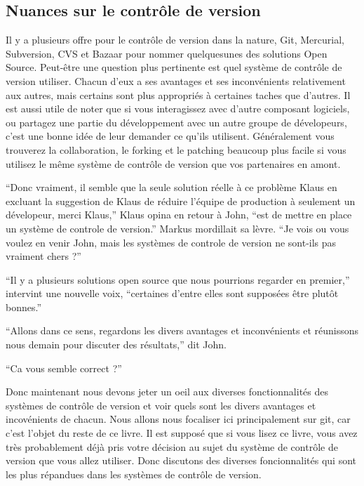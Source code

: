 \subsection{Nuances sur le contrôle de version}
Il y a plusieurs offre pour le contrôle de version dans la nature, Git, Mercurial, Subversion, CVS et Bazaar pour nommer quelquesunes des solutions Open Source.
Peut-être une question plus pertinente est quel système de contrôle de version utiliser.
Chacun d'eux a ses avantages et ses inconvénients relativement aux autres, mais certains sont plus appropriés à certaines taches que d'autres.
Il est aussi utile de noter que si vous interagissez avec d'autre composant logiciels, ou partagez une partie du développement avec un autre
groupe de dévelopeurs, c'est une bonne idée de leur demander ce qu'ils utilisent.
Généralement vous trouverez la collaboration, le forking et le patching beaucoup plus facile si vous utilisez le même système de contrôle de version que vos partenaires en amont.

\begin{trenches}
``Donc vraiment, il semble que la seule solution réelle à ce problème Klaus en excluant la suggestion de Klaus de réduire l'équipe de production à seulement un dévelopeur, merci Klaus,'' Klaus opina en retour à John, ``est de mettre en place un système de controle de version.''
Markus mordillait sa lèvre.
``Je vois ou vous voulez en venir John, mais les systèmes de controle de version ne sont-ils pas vraiment chers ?''

``Il y a plusieurs solutions open source que nous pourrions regarder en premier,'' intervint une nouvelle voix, ``certaines d'entre elles sont supposées être plutôt bonnes.''

``Allons dans ce sens, regardons les divers avantages et inconvénients et réunissons nous demain pour discuter des résultats,'' dit John.

``Ca vous semble correct ?''
\end{trenches}


Donc maintenant nous devons jeter un oeil aux diverses fonctionnalités des systèmes de contrôle de version et voir quels sont les divers avantages et incovénients de chacun.
Nous allons nous focaliser ici principalement sur git, car c'est l'objet du reste de ce livre.
Il est supposé que si vous lisez ce livre, vous avez très probablement déjà pris votre décision au sujet du système de contrôle de version que vous allez utiliser.
Donc discutons des diverses foncionnalités qui sont les plus répandues dans les systèmes de contrôle de version.

